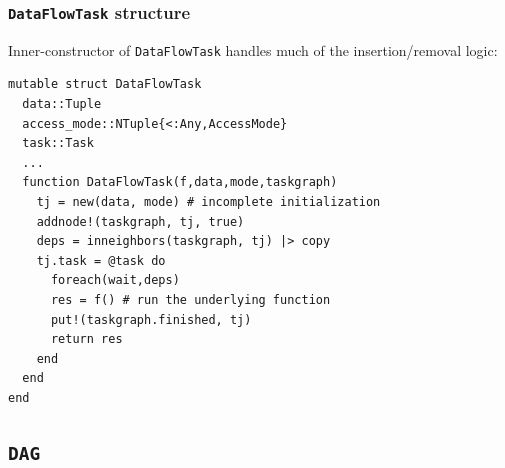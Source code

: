 \documentclass{beamer}
\begin{document}
\begin{frame}[fragile]

\frametitle{\texttt{DataFlowTask} structure}

\small{\alert{Inner-constructor of \texttt{DataFlowTask} handles much of
the insertion/removal logic:}}

\hrulefill
\begin{verbatim}
mutable struct DataFlowTask
  data::Tuple
  access_mode::NTuple{<:Any,AccessMode}
  task::Task
  ...
  function DataFlowTask(f,data,mode,taskgraph)
    tj = new(data, mode) # incomplete initialization
    addnode!(taskgraph, tj, true) 
    deps = inneighbors(taskgraph, tj) |> copy
    tj.task = @task do
      foreach(wait,deps)
      res = f() # run the underlying function
      put!(taskgraph.finished, tj)
      return res
    end
  end
end
\end{verbatim}

\end{frame} 

\subsection{\texttt{DAG}}
\end{document}

